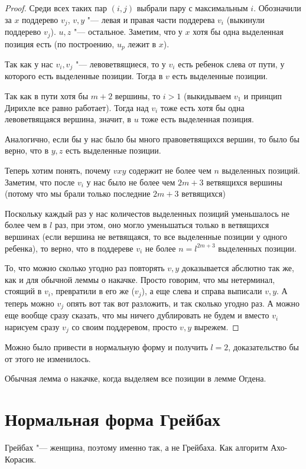 \begin{proof}
Среди всех таких пар $(i, j)$ выбрали пару с максимальным $i$.
Обозначили за $x$ поддерево $v_j$, $v, y$ "--- левая и правая части поддерева $v_i$ (выкинули поддерево $v_j$). 
$u, z$ "--- остальное. 
Заметим, что у $x$ хотя бы одна выделенная позиция есть (по построению, $u_p$ лежит в $x$).

Так как у нас $v_i, v_j$ "--- левоветвящиеся, то у $v_i$ есть ребенок слева от пути, у которого есть выделенные позиции. 
Тогда в $v$ есть выделенные позиции.

Так как в пути хотя бы $m + 2$ вершины, то $i > 1$ (выкидываем $v_1$ и принцип Дирихле все равно работает).
Тогда над $v_i$ тоже есть хотя бы одна левоветвящаяся вершина, значит, в $u$ тоже есть выделенная позиция.

Аналогично, если бы у нас было бы много правоветвящихся вершин, то было бы верно, что в $y, z$ есть выделенные позиции.

Теперь хотим понять, почему $vxy$ содержит не более чем $n$ выделенных позиций.
Заметим, что после $v_i$ у нас было не более чем $2m + 3$ ветвящихся вершины (потому что мы брали только последние $2m + 3$ ветвящихся)

Поскольку каждый раз у нас количестов выделенных позиций уменьшалось не более чем в $l$ раз, при этом, 
оно могло уменьшаться только в ветвящихся вершинах (если вершина не ветвящаяся, то все выделенные позиции у одного ребенка), то верно, что
в поддереве $v_i$ не более $n = l^{2m + 3}$ выделенных позиции.

То, что можно сколько угодно раз повторять $v, y$ доказывается абслютно так же, как и для обычной леммы о накачке.
Просто говорим, что мы нетерминал, стоящий в $v_i$, превратили в его же ($v_j$), а еще слева и справа выписали $v, y$. 
А теперь можно $v_j$ опять вот так вот разложить, и так сколько угодно раз. 
А можно еще вообще сразу сказать, что мы ничего дублировать не будем и  вместо $v_i$ нарисуем сразу $v_j$ со своим поддеревом, просто $v, y$ вырежем.
\end{proof}
\begin{Rem}
Можно было привести в нормальную форму и получить $l = 2$, доказательство бы от этого не изменилось.
\end{Rem}
\begin{conseq}
Обычная лемма о накачке, когда выделяем все позиции в лемме Огдена.
\end{conseq}

\section{Нормальная форма Грейбах}
\begin{Rem}
Грейбах "--- женщина, поэтому именно так, а не Грейбаха. 
Как алгоритм Ахо-Корасик.
\end{Rem}

